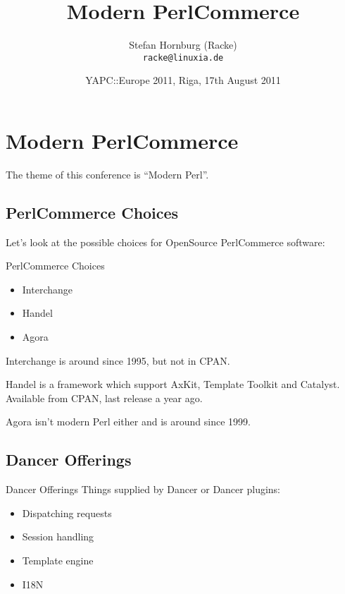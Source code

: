 
\usepackage[T1]{fontenc}
\usepackage{mathptmx}
\usepackage[scaled=.90]{helvet}
\usepackage{courier}

\usepackage{beamerthemesplit}
\usepackage{verbatim}
\usepackage{hyperref}
\usepackage{listings}
\lstset{language=Perl,basicstyle=\footnotesize,tabsize=3,showstringspaces=false}

\title{Modern PerlCommerce}
\author[racke]{Stefan Hornburg (Racke)\\ \texttt{racke@linuxia.de}}
\date[]{YAPC::Europe 2011, Riga, 17th August 2011}


\maketitle{}

\begin{frame}
  \titlepage
\end{frame}

\tableofcontents

\section{Modern PerlCommerce}
The theme of this conference is ``Modern Perl''.

\subsection{PerlCommerce Choices}
Let's look at the possible choices for OpenSource PerlCommerce software:

\begin{frame}{PerlCommerce Choices}
\begin{itemize}
\item Interchange
\item Handel
\item Agora
\end{itemize}
\end{frame}

Interchange is around since 1995, but not in CPAN.

Handel is a framework which support AxKit, Template Toolkit 
and Catalyst.
Available from CPAN, last release a year ago.

Agora isn't modern Perl either and is around since 1999.

\subsection{Dancer Offerings}
\begin{frame}{Dancer Offerings}
Things supplied by Dancer or Dancer plugins:

\begin{itemize}
\item Dispatching requests
\item Session handling
\item Template engine
\item I18N
\end{itemize}
\end{frame}

